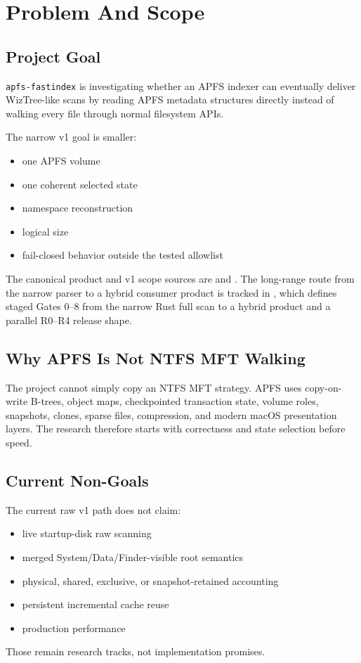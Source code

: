 \chapter{Problem And Scope}

\section{Project Goal}

\texttt{apfs-fastindex} is investigating whether an APFS indexer can eventually
deliver WizTree-like scans by reading APFS metadata structures directly instead
of walking every file through normal filesystem APIs.

The narrow v1 goal is smaller:

\begin{itemize}
  \item one APFS volume
  \item one coherent selected state
  \item namespace reconstruction
  \item logical size
  \item fail-closed behavior outside the tested allowlist
\end{itemize}

The canonical product and v1 scope sources are  and
.
The long-range route from the narrow parser to a hybrid consumer product is
tracked in
, which
defines staged Gates 0--8 from the narrow Rust full scan to a hybrid product
and a parallel R0--R4 release shape.

\section{Why APFS Is Not NTFS MFT Walking}

The project cannot simply copy an NTFS MFT strategy. APFS uses copy-on-write
B-trees, object maps, checkpointed transaction state, volume roles, snapshots,
clones, sparse files, compression, and modern macOS presentation layers. The
research therefore starts with correctness and state selection before speed.

\section{Current Non-Goals}

The current raw v1 path does not claim:

\begin{itemize}
  \item live startup-disk raw scanning
  \item merged System/Data/Finder-visible root semantics
  \item physical, shared, exclusive, or snapshot-retained accounting
  \item persistent incremental cache reuse
  \item production performance
\end{itemize}

Those remain research tracks, not implementation promises.
